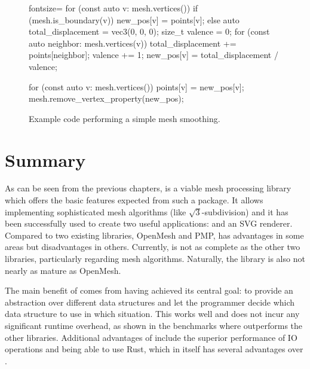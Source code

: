 \begin{figure}[p]
\begin{minipage}{.9\textwidth}
\begin{cppcode*}{fontsize=\footnotesize}
      for (const auto v: mesh.vertices()) {
          if (mesh.is_boundary(v)) {
              new_pos[v] = points[v];
          } else {
              auto total_displacement = vec3(0, 0, 0);
              size_t valence = 0;
              for (const auto neighbor: mesh.vertices(v)) {
                  total_displacement += points[neighbor];
                  valence += 1;
              }
              new_pos[v] = total_displacement / valence;
          }
      }

      for (const auto v: mesh.vertices()) {
          points[v] = new_pos[v];
      }
      mesh.remove_vertex_property(new_pos);
    \end{cppcode*}
  \end{minipage}

  \caption{
    Example code performing a simple mesh smoothing.
  }
  \label{fig:example-smooth}
\end{figure}


\newpage
\section{Summary}

As can be seen from the previous chapters,  is a viable mesh processing library which offers the basic features expected from such a package.
It allows implementing sophisticated mesh algorithms (like $\sqrt{3}$-subdivision) and it has been successfully used to create two useful applications:  and an SVG renderer.
Compared to two existing \cpp libraries, OpenMesh and PMP,  has advantages in some areas but disadvantages in others.
Currently,  is not as complete as the other two libraries, particularly regarding mesh algorithms.
Naturally, the library is also not nearly as mature as OpenMesh.

The main benefit of  comes from having achieved its central goal:
to provide an abstraction over different data structures and let the programmer decide which data structure to use in which situation.
This works well and does not incur any significant runtime overhead, as shown in the benchmarks where  outperforms the other libraries.
Additional advantages of  include the superior performance of IO operations and being able to use Rust, which in itself has several advantages over \cpp.

